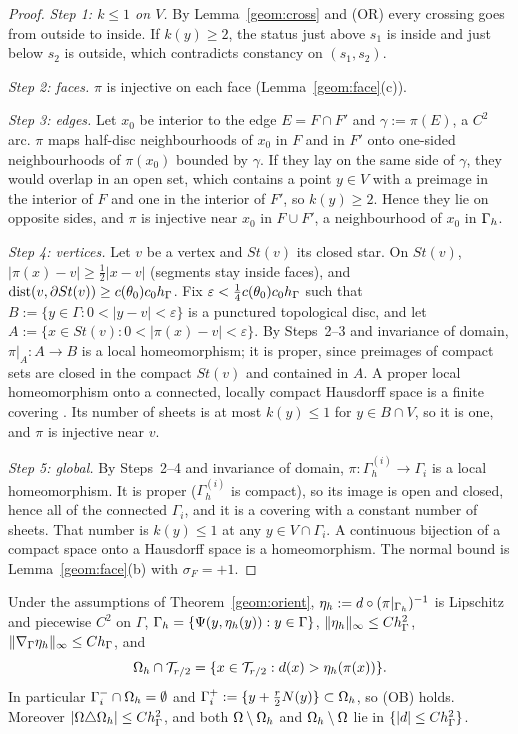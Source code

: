 \begin{proof}
\emph{Step 1: $k\le1$ on $V$.} By Lemma~\ref{geom:cross} and (OR) every crossing goes from outside to inside. If $k(y)\ge2$, the status just above $s_1$ is inside and just below $s_2$ is outside, which contradicts constancy on $(s_1,s_2)$.

\emph{Step 2: faces.} $\pi$ is injective on each face (Lemma~\ref{geom:face}(c)).

\emph{Step 3: edges.} Let $x_0$ be interior to the edge $E=F\cap F'$ and $\gamma:=\pi(E)$, a $C^2$ arc. $\pi$ maps half-disc neighbourhoods of $x_0$ in $F$ and in $F'$ onto one-sided neighbourhoods of $\pi(x_0)$ bounded by $\gamma$. If they lay on the same side of $\gamma$, they would overlap in an open set, which contains a point $y\in V$ with a preimage in the interior of $F$ and one in the interior of $F'$, so $k(y)\ge2$. Hence they lie on opposite sides, and $\pi$ is injective near $x_0$ in $F\cup F'$, a neighbourhood of $x_0$ in $\Gamma_h$.

\emph{Step 4: vertices.} Let $v$ be a vertex and $St(v)$ its closed star. On $St(v)$, $|\pi(x)-v|\ge\frac12|x-v|$ (segments stay inside faces), and $\operatorname{dist}(v,\partial St(v))\ge c(\theta_0)c_0h_\Gamma$. Fix $\varepsilon<\frac14c(\theta_0)c_0h_\Gamma$ such that $B:=\{y\in\Gamma:0<|y-v|<\varepsilon\}$ is a punctured topological disc, and let $A:=\{x\in St(v):0<|\pi(x)-v|<\varepsilon\}$. By Steps~2--3 and invariance of domain, $\pi|_A:A\to B$ is a local homeomorphism; it is proper, since preimages of compact sets are closed in the compact $St(v)$ and contained in $A$. A proper local homeomorphism onto a connected, locally compact Hausdorff space is a finite covering \cite[Theorem~4.22]{Forster1981}. Its number of sheets is at most $k(y)\le1$ for $y\in B\cap V$, so it is one, and $\pi$ is injective near $v$.

\emph{Step 5: global.} By Steps~2--4 and invariance of domain, $\pi:\Gamma_h^{(i)}\to\Gamma_i$ is a local homeomorphism. It is proper ($\Gamma_h^{(i)}$ is compact), so its image is open and closed, hence all of the connected $\Gamma_i$, and it is a covering with a constant number of sheets. That number is $k(y)\le1$ at any $y\in V\cap\Gamma_i$. A continuous bijection of a compact space onto a Hausdorff space is a homeomorphism. The normal bound is Lemma~\ref{geom:face}(b) with $\sigma_F=+1$.
\end{proof}

\begin{corollary}\label{geom:graph}
Under the assumptions of Theorem~\ref{geom:orient}, $\eta_h:=d\circ(\pi|_{\Gamma_h})^{-1}$ is Lipschitz and piecewise $C^2$ on $\Gamma$, $\Gamma_h=\{\Psi(y,\eta_h(y)):y\in\Gamma\}$, $\lVert \eta_h\rVert_\infty\le Ch_\Gamma^2$, $\lVert \nabla_\Gamma\eta_h\rVert_\infty\le Ch_\Gamma$, and
\[
\Omega_h\cap\mathcal T_{r/2}=\{x\in\mathcal T_{r/2}:d(x)>\eta_h(\pi(x))\}.
\]
In particular $\Gamma_i^-\cap\Omega_h=\emptyset$ and $\Gamma_i^+:=\{y+\frac r2N(y)\}\subset\Omega_h$, so (OB) holds. Moreover $|\Omega\triangle\Omega_h|\le Ch_\Gamma^2$, and both $\Omega\setminus\Omega_h$ and $\Omega_h\setminus\Omega$ lie in $\{|d|\le Ch_\Gamma^2\}$.
\end{corollary}

